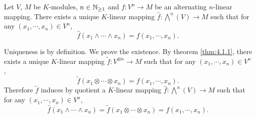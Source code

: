 \begin{propositionenv}
    Let $V$, $M$ be $K$-modules, $n\in \mathbb{N}_{\ge 1}$ and $f: V^n \rightarrow M$ be an alternating $n$-linear mapping.
    There exists a unique $K$-linear mapping $\hat{f} : \bigwedge^n (V) \rightarrow M$ such that for any $\left(x_1,\cdots, x_n\right) \in V^n$, 
    $$\hat{f}\left(x_1 \wedge \cdots \wedge x_n\right) = f\left(x_1,\cdots,x_n\right).$$
    \begin{center}
    \end{center}
\end{propositionenv}
\begin{proofenv}
    Uniqueness is by definition.
    We prove the existence.
    By theorem \ref{thm:4.1.1}, there exists a unique $K$-linear mapping $\tilde{f} : V^{\otimes n} \rightarrow M$ such that for any $(x_1,\cdots,x_n) \in V^n$,
    $$ \tilde{f}\left(x_1 \otimes \cdots \otimes x_n\right) = f\left(x_1,\cdots,x_n\right).$$
    Therefore $\tilde{f}$ induces by quotient a $K$-linear mapping $\hat{f} : \bigwedge^n (V) \rightarrow M$ such that for any $(x_1,\cdots,x_n) \in V^n$,
    $$ \hat{f}\left(x_1 \wedge \cdots \wedge x_n\right) = \tilde{f}\left(x_1 \otimes \cdots \otimes x_n\right) = f\left(x_1,\cdots,x_n\right).$$
\end{proofenv}

